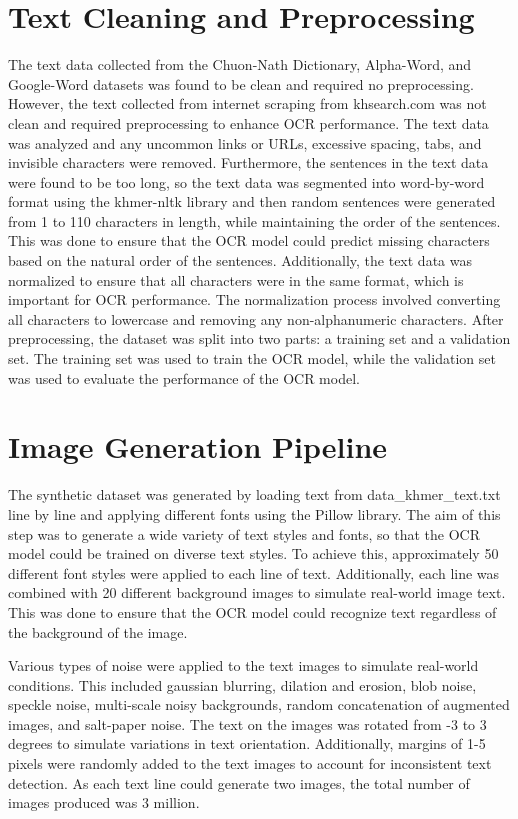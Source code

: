 \section{Text Cleaning and Preprocessing}
\label{sec:preprocessing}
The text data collected from the Chuon-Nath Dictionary, Alpha-Word, 
and Google-Word datasets was found to be clean and required no preprocessing. 
However, the text collected from internet scraping from khsearch.com was not 
clean and required preprocessing to enhance OCR performance. The text data was 
analyzed and any uncommon links or URLs, excessive spacing, tabs, and invisible 
characters were removed. Furthermore, the sentences in the text data were found 
to be too long, so the text data was segmented into word-by-word format using the 
khmer-nltk library and then random sentences were generated from 1 to 110 
characters in length, while maintaining the order of the sentences. 
This was done to ensure that the OCR model could predict missing characters 
based on the natural order of the sentences. Additionally, the text data was 
normalized to ensure that all characters were in the same format, which is 
important for OCR performance. The normalization process involved converting 
all characters to lowercase and removing any non-alphanumeric characters. 
After preprocessing, the dataset was split into two parts: a training set 
and a validation set. The training set was used to train the OCR model, 
while the validation set was used to evaluate the performance of the OCR model.


\section{Image Generation Pipeline}
\label{sec:generation}
The synthetic dataset was generated by loading text from data\_khmer\_text.txt line 
by line and applying different fonts using the Pillow library. The aim of this 
step was to generate a wide variety of text styles and fonts, so that the OCR 
model could be trained on diverse text styles. To achieve this, approximately 
50 different font styles were applied to each line of text. Additionally, 
each line was combined with 20 different background images to simulate real-world 
image text. This was done to ensure that the OCR model could recognize text 
regardless of the background of the image.

Various types of noise were applied to the text images to simulate real-world 
conditions. This included gaussian blurring, dilation and erosion, blob noise, 
speckle noise, multi-scale noisy backgrounds, random concatenation of augmented 
images, and salt-paper noise. The text on the images was rotated from -3 to 3 
degrees to simulate variations in text orientation. Additionally, margins of 
1-5 pixels were randomly added to the text images to account for inconsistent 
text detection. As each text line could generate two images, the total number 
of images produced was 3 million.

